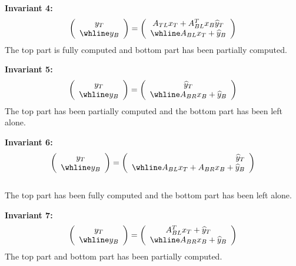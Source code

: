 \documentclass[12pt]{article}
\begin{document}
\begin{description}
\item
{\bf Invariant 4:}
\begin{equation}
    \left(\begin{array}{c}
        y_T \\ \whline
        y_B 
    \end{array}\right)  = 
    \left(\begin{array}{c}
        A_{TL} x_T +  A_{BL}^T x_B \widehat y_T \\ \whline 
        A_{BL} x_T + \widehat y_B 
    \end{array}\right)
\label{eq:inv3}
\end{equation}
 The top part is fully computed and bottom part has been partially computed.
 	\item
	{\bf Invariant 5:}
\begin{equation}
	\left(\begin{array}{c}
		y_T \\ \whline
		y_B 
	\end{array}\right)  = 
	\left(\begin{array}{c}
		 \widehat y_T \\ \whline 
		A_{BR}x_{B} + \widehat y_B 
	\end{array}\right)
\label{eq:inv5}
\end{equation}
	The top part has been partially computed and the bottom part has been left
alone. 
	\item
	{\bf Invariant 6:}
\begin{equation}
\left(\begin{array}{c}
		y_T \\ \whline
		y_B 
	\end{array}\right)  = 
	\left(\begin{array}{r}
		\widehat y_T \\ \whline 
		A_{BL}x_T + A_{BR}x_{B} + \widehat y_B 
	\end{array}\right)
	\label{eq:inv6}
	\end{equation} \\
	The top part has been fully computed and the bottom part has been left
alone.
\item 
{\bf Invariant 7:}
\begin{equation}
    \left(\begin{array}{c}
        y_T \\ \whline
        y_B 
    \end{array}\right)  = 
    \left(\begin{array}{c}
        A_{BL}^T x_T + \widehat y_T \\ \whline 
        A_{BR} x_B + \widehat y_B 
    \end{array}\right)
\label{eq:inv7}
\end{equation}
    The top part and bottom part has been partially computed.


\end{description}
\end{document}
